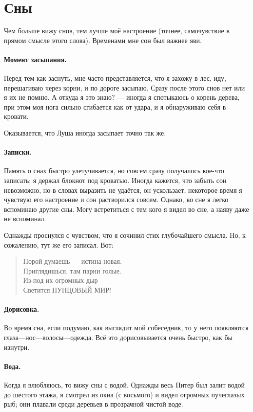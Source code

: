 \documentclass{book}
\begin{document}
\section*{Сны}

Чем больше вижу снов, тем лучше моё настроение (точнее, самочувствие в прямом смысле этого слова).
Временами мне сон был важнее яви.

\paragraph{Момент засыпания.}
Перед тем как заснуть, мне часто представляется, что я захожу в лес, иду, перешагиваю через корни, и по дороге засыпаю.
Сразу после этого снов нет или я их не помню.
А откуда я это знаю? --- иногда я спотыкаюсь о корень дерева, при этом моя нога сильно сгибается как от удара, и я обнаруживаю себя в кровати.

Оказывается, что Луша иногда засыпает точно так же.

\paragraph{Записки.}
Память о снах быстро улетучивается, но совсем сразу получалось кое-что записать;
я держал блокнот под кроватью.
Иногда кажется, что забыть сон невозможно, но в словах выразить не удаётся, он ускользает, некоторое время я чувствую его настроение и сон растворился совсем.
Однако, во сне я легко вспоминаю другие сны.
Могу встретиться с тем кого я видел во сне, а наяву даже не вспоминал.

Однажды проснулся с чувством, что я сочинил стих глубочайшего смысла.
Но, к сожалению, тут же его записал.
Вот:
\begin{verse}
Порой думаешь --- истина новая.\\
Приглядишься, там парни голые.\\
Из-под их огромных дыр\\
Светится ПУНЦОВЫЙ МИР!
\end{verse}

\paragraph{Дорисовка.}
Во время сна, если подумаю, как выглядит мой собеседник, то у него появляются глаза---нос---волосы---одежда.
Всё это дорисовывается очень быстро, как бы изнутри.

\paragraph{Вода.}
Когда я влюбляюсь, то вижу сны с водой.
Однажды весь Питер был залит водой до шестого этажа, я смотрел из окна (с восьмого) и видел огромных пучеглазых рыб; они плавали среди деревьев в прозрачной чистой воде.
\end{document}
